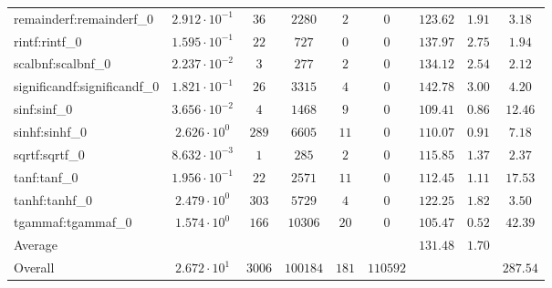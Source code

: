 \begin{tabular}{|l|c|c|c|c|c|c|c|c|}
remainderf:remainderf\_0     & $ 2.912 \cdot 10^{-1} $ & $ 36     $ & $ 2280   $ & $ 2   $ & $ 0      $ & $ 123.62      $ & $ 1.91    $ & $ 3.18    $ \\
rintf:rintf\_0               & $ 1.595 \cdot 10^{-1} $ & $ 22     $ & $ 727    $ & $ 0   $ & $ 0      $ & $ 137.97      $ & $ 2.75    $ & $ 1.94    $ \\
scalbnf:scalbnf\_0           & $ 2.237 \cdot 10^{-2} $ & $ 3      $ & $ 277    $ & $ 2   $ & $ 0      $ & $ 134.12      $ & $ 2.54    $ & $ 2.12    $ \\
significandf:significandf\_0 & $ 1.821 \cdot 10^{-1} $ & $ 26     $ & $ 3315   $ & $ 4   $ & $ 0      $ & $ 142.78      $ & $ 3.00    $ & $ 4.20    $ \\
sinf:sinf\_0                 & $ 3.656 \cdot 10^{-2} $ & $ 4      $ & $ 1468   $ & $ 9   $ & $ 0      $ & $ 109.41      $ & $ 0.86    $ & $ 12.46   $ \\
sinhf:sinhf\_0               & $ 2.626 \cdot 10^{0}  $ & $ 289    $ & $ 6605   $ & $ 11  $ & $ 0      $ & $ 110.07      $ & $ 0.91    $ & $ 7.18    $ \\
sqrtf:sqrtf\_0               & $ 8.632 \cdot 10^{-3} $ & $ 1      $ & $ 285    $ & $ 2   $ & $ 0      $ & $ 115.85      $ & $ 1.37    $ & $ 2.37    $ \\
tanf:tanf\_0                 & $ 1.956 \cdot 10^{-1} $ & $ 22     $ & $ 2571   $ & $ 11  $ & $ 0      $ & $ 112.45      $ & $ 1.11    $ & $ 17.53   $ \\
tanhf:tanhf\_0               & $ 2.479 \cdot 10^{0}  $ & $ 303    $ & $ 5729   $ & $ 4   $ & $ 0      $ & $ 122.25      $ & $ 1.82    $ & $ 3.50    $ \\
tgammaf:tgammaf\_0           & $ 1.574 \cdot 10^{0}  $ & $ 166    $ & $ 10306  $ & $ 20  $ & $ 0      $ & $ 105.47      $ & $ 0.52    $ & $ 42.39   $ \\
\hline
Average                      & $                     $ & $        $ & $        $ & $     $ & $        $ & $ 131.48      $ & $ 1.70    $ & $         $ \\
\hline
Overall                      & $ 2.672 \cdot 10^{1}  $ & $ 3006   $ & $ 100184 $ & $ 181 $ & $ 110592 $ & $             $ & $         $ & $ 287.54  $ \\
\hline
\end{tabular}
